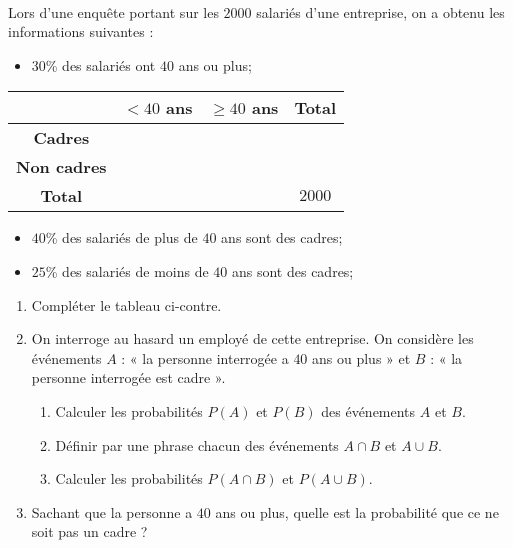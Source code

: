\documentclass[11pt]{article}
\begin{document}
\begin{exo}~\\
\begin{minipage}{.5\textwidth}
  Lors d'une enquête portant sur les $2000$ salariés d'une entreprise, on a
  obtenu les informations suivantes :
\begin{itemize}
  \item $30$\% des salariés ont $40$ ans ou plus;
\end{itemize}
\end{minipage}
\begin{minipage}{.5\textwidth}
  \begin{center}
 \begin{tabular}{cccc}
  \toprule
  & \textbf{$<40$ ans} & \textbf{$\geq40$ ans} & \textbf{Total} \\
  \midrule
  \textbf{Cadres} &  &  &  \\
  \textbf{Non cadres} &  &  &  \\
  \textbf{Total} &  & & $2000$ \\
  \bottomrule
\end{tabular}
  \end{center}
\end{minipage}
\begin{itemize}
  \item $40$\% des salariés de plus de $40$ ans sont des cadres;
  \item $25$\% des salariés de moins de $40$ ans sont des cadres;
\end{itemize}
\begin{enumerate}
  \item Compléter le tableau ci-contre.
  \item On interroge au hasard un employé de cette entreprise. On considère les
    événements $A$ : « la personne interrogée a $40$ ans ou plus » et $B$ : « la
    personne interrogée est cadre ».
    \begin{enumerate}
      \item Calculer les probabilités $P(A)$ et $P(B)$ des événements $A$ et
        $B$.
      \item Définir par une phrase chacun des événements $A\cap B$ et $A\cup B$.
    \item Calculer les probabilités $P(A\cap B)$ et $P(A\cup B)$.
    \end{enumerate}
  \item Sachant que la personne a $40$ ans ou plus, quelle est la probabilité
    que ce ne soit pas un cadre ?
\end{enumerate}
\end{exo}
\end{document}
